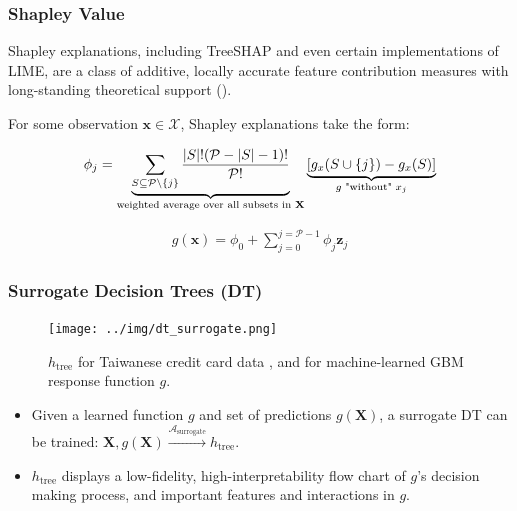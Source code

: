 \documentclass[11pt,aspectratio=169,hyperref={colorlinks}]{beamer}
\begin{document}
	\begin{frame}
	
		\frametitle{Shapley Value}	
	
		Shapley explanations, including TreeSHAP and even certain implementations of LIME, are a class of additive, locally accurate feature contribution measures with long-standing theoretical support (\cite{shapley}). 
	
		\vspace{8pt}
	
		For some observation $\mathbf{x} \in \mathcal{X}$, Shapley explanations take the form:
	
		\begin{equation}
		\label{eq:shap_contrib}
		\begin{aligned}
		\phi_{j} = \underbrace{\sum_{S \subseteq \mathcal{P} \setminus \{j\}}\frac{|S|!(\mathcal{P} -|S| -1)!}{\mathcal{P}!}}_\text{weighted average over all subsets in \textbf{X}}\underbrace{[g_x(S \cup \{j\}) - g_x(S)]}_{g\text{ "without" }x_j}
		\end{aligned}
		\end{equation}
		
		\begin{equation}
		\label{eq:shap_additive}
		\begin{aligned}
		g(\mathbf{x}) = \phi_0 + \sum_{j=0}^{j=\mathcal{P} - 1} \phi_j \mathbf{z}_j
		\end{aligned}
		\end{equation}
	
	\end{frame}

	\begin{frame}[t]
	
		\frametitle{Surrogate Decision Trees (DT)}
		
		\begin{figure}[htb]
			\begin{center}
				\texttt{[image: ../img/dt\_surrogate.png]}
				\label{fig:dt_surrogate}
				\caption{$h_{\text{tree}}$ for Taiwanese credit card data \cite{uci}, and for machine-learned GBM response function $g$.}
			\end{center}
		\end{figure}
		
		\vspace{-20 pt}
		
		\begin{itemize}
			
			\item Given a learned function $g$ and set of predictions $g(\mathbf{X})$, a surrogate DT can be trained: $ \mathbf{X}, g(\mathbf{X}) \xrightarrow{\mathcal{A}_{\text{surrogate}}} h_{\text{tree}}$.
			
			\item $h_{\text{tree}}$ displays a low-fidelity, high-interpretability flow chart of $g$'s decision making process, and important features and interactions in $g$.	
			
		\end{itemize}
		
	\end{frame}
	
\end{document}
